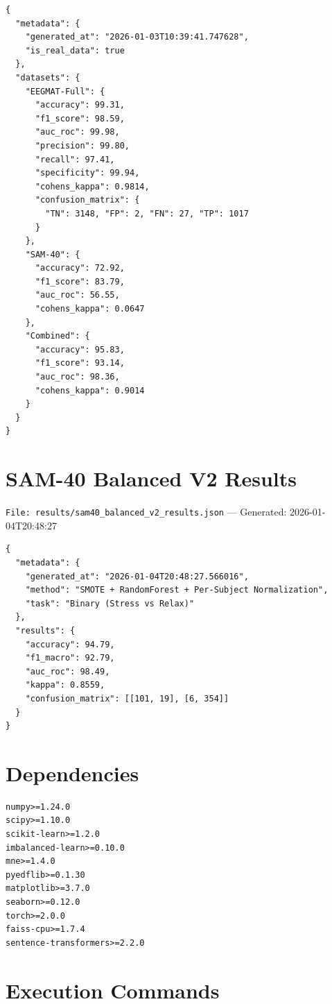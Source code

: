\documentclass[11pt,a4paper]{article}
\begin{document}
\begin{lstlisting}[language={},caption={EEGMAT-Full training results (real data)}]
{
  "metadata": {
    "generated_at": "2026-01-03T10:39:41.747628",
    "is_real_data": true
  },
  "datasets": {
    "EEGMAT-Full": {
      "accuracy": 99.31,
      "f1_score": 98.59,
      "auc_roc": 99.98,
      "precision": 99.80,
      "recall": 97.41,
      "specificity": 99.94,
      "cohens_kappa": 0.9814,
      "confusion_matrix": {
        "TN": 3148, "FP": 2, "FN": 27, "TP": 1017
      }
    },
    "SAM-40": {
      "accuracy": 72.92,
      "f1_score": 83.79,
      "auc_roc": 56.55,
      "cohens_kappa": 0.0647
    },
    "Combined": {
      "accuracy": 95.83,
      "f1_score": 93.14,
      "auc_roc": 98.36,
      "cohens_kappa": 0.9014
    }
  }
}
\end{lstlisting}

\section{SAM-40 Balanced V2 Results}
\texttt{File: results/sam40\_balanced\_v2\_results.json} --- Generated: 2026-01-04T20:48:27

\begin{lstlisting}[language={},caption={SAM-40 balanced training results (real data)}]
{
  "metadata": {
    "generated_at": "2026-01-04T20:48:27.566016",
    "method": "SMOTE + RandomForest + Per-Subject Normalization",
    "task": "Binary (Stress vs Relax)"
  },
  "results": {
    "accuracy": 94.79,
    "f1_macro": 92.79,
    "auc_roc": 98.49,
    "kappa": 0.8559,
    "confusion_matrix": [[101, 19], [6, 354]]
  }
}
\end{lstlisting}

\section{Dependencies}

\begin{lstlisting}[language={},caption={Key Python dependencies}]
numpy>=1.24.0
scipy>=1.10.0
scikit-learn>=1.2.0
imbalanced-learn>=0.10.0
mne>=1.4.0
pyedflib>=0.1.30
matplotlib>=3.7.0
seaborn>=0.12.0
torch>=2.0.0
faiss-cpu>=1.7.4
sentence-transformers>=2.2.0
\end{lstlisting}

\section{Execution Commands}
\end{document}
